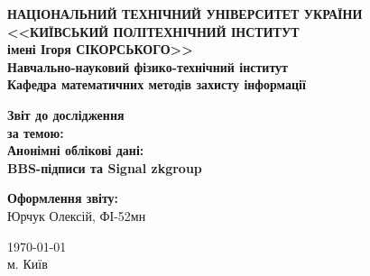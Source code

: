 \thispagestyle{empty}
\linespread{1.1}

\begin{center}
    {\bfseries\large
        НАЦІОНАЛЬНИЙ ТЕХНІЧНИЙ УНІВЕРСИТЕТ УКРАЇНИ \\
        <<КИЇВСЬКИЙ ПОЛІТЕХНІЧНИЙ ІНСТИТУТ \\
        імені Ігоря СІКОРСЬКОГО>> \\
        Навчально-науковий фізико-технічний інститут \\
        \medskip
        Кафедра математичних методів захисту інформації}
\end{center}

\begin{center}
\vspace{40mm}
{\bfseries\huge Звіт до дослідження} \\
{\bfseries\Large за темою:} \\
{\bfseries\Large Анонімні облікові дані:} \\
{\bfseries\Large BBS-підписи та Signal zkgroup} \\
\end{center}

\vspace{55mm}
\begin{center}
    \hfill
    \begin{minipage}[t]{0.4\textwidth}
        \begin{flushright}
            \textbf{Оформлення звіту:} \\
                Юрчук Олексій, ФІ-52мн \\
        \end{flushright}
    \end{minipage}
\end{center}

\vfill
\begin{center}
    \today \\
    {м. Київ}
\end{center}

\newpage
{}
